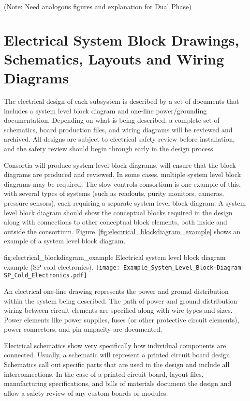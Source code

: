 (Note: Need analogous figures and explanation for Dual Phase)




\section{Electrical System Block Drawings, Schematics, Layouts and Wiring Diagrams}
\label{sec:fdsp-coord-electrical}


The electrical design of each subsystem is described by a
set of documents that includes a system level block
diagram and one-line power/grounding documentation.
Depending on what is being described, a complete set of schematics,
board production files, and wiring diagrams will be reviewed and archived.  All
designs are subject to electrical safety review before
installation, and the safety review should begin through
 early in the design process.


Consortia will produce system level block
diagrams.  will ensure that the
block diagrams are produced and reviewed.  In some cases, multiple
system level block diagrams may be required.  The slow controls consortium is one example of this, with several types of systems (such as 
readouts, purity monitors, cameras, pressure sensors), each
requiring a separate system level block diagram. A system level block
diagram should show the conceptual blocks required in the design along with connections to other conceptual block elements, both inside and outside the consortium.  
Figure~\ref{fig:electrical_blockdiagram_example} shows an example of a system level block diagram.
\begin{dunefigure}{fig:electrical_blockdiagram_example}
  {Electrical system level block diagram example (SP cold electronics).}
 \texttt{[image: Example\_System\_Level\_Block-Diagram-SP\_Cold\_Electronics.pdf]}
\end{dunefigure}


An electrical one-line drawing represents the power and ground
distribution within the system being described.  The path of power and
ground distribution wiring between circuit elements are
specified along with wire types and sizes.  Power elements like power supplies, fuses (or other protective circuit elements),
power connectors, and pin ampacity are documented.


Electrical schematics show very specifically how individual
components are connected.  Usually, a schematic will represent a
printed circuit board design.  Schematics call out specific
parts that are used in the design and include all interconnections.
In the case of a printed circuit board, layout files, manufacturing
specifications, and bills of materials document
the design and allow a safety review of any custom boards or
modules.


